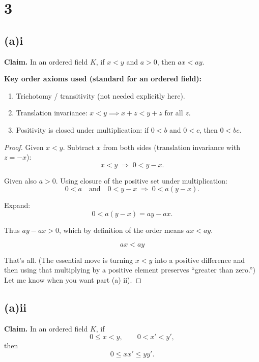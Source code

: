 \documentclass[12pt,a4paper]{article}
\theoremstyle{definition}
\theoremstyle{remark}
\begin{document}
\section*{3}
\subsection*{(a)i}
\textbf{Claim.} In an ordered field $K$, if $x<y$ and $a>0$, then $ax<ay$.

\textbf{Key order axioms used (standard for an ordered field):}
\begin{enumerate}
    \item Trichotomy / transitivity (not needed explicitly here).
    \item Translation invariance: $x<y \implies x+z < y+z$ for all $z$.
    \item Positivity is closed under multiplication: if $0<b$ and $0<c$, then $0<bc$.
\end{enumerate}

\begin{proof}
Given $x<y$. Subtract $x$ from both sides (translation invariance with $z=-x$):
$$x<y \;\Longrightarrow\; 0< y - x.$$

Given also $a>0$. Using closure of the positive set under multiplication:
$$0 < a \quad\text{and}\quad 0< y-x \;\Longrightarrow\; 0 < a(y-x).$$

Expand:
$$0 < a(y-x) = ay - ax.$$

Thus $ay - ax > 0$, which by definition of the order means $ax < ay$.

$$\boxed{ax < ay}$$

That's all. (The essential move is turning $x<y$ into a positive difference and then using that multiplying by a positive element preserves ``greater than zero.'') Let me know when you want part (a) ii).
\end{proof}

\subsection*{(a)ii}

\textbf{Claim.} In an ordered field \(K\), if  
\[
0 \le x < y, \qquad 0 < x' < y',
\]
then
\[
0 \le x x' \le y y'.
\]
\end{document}
